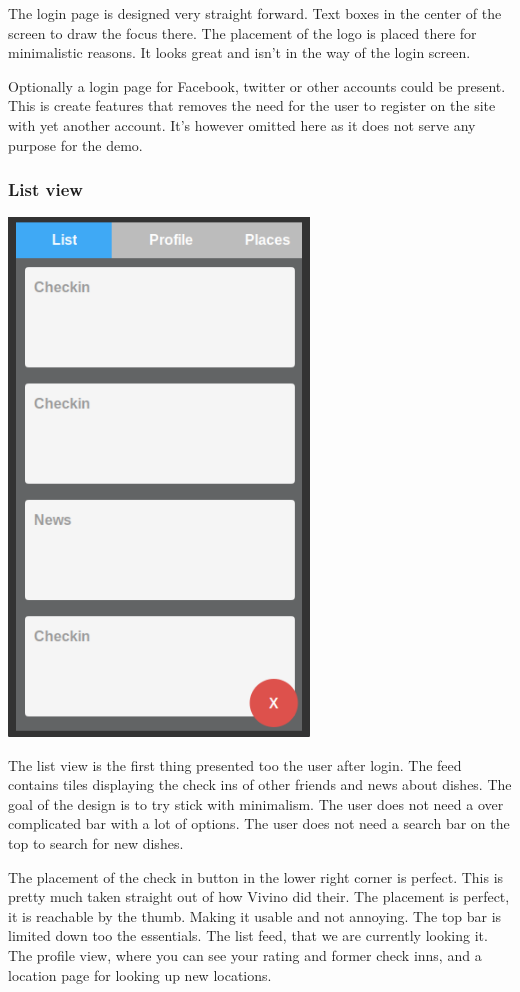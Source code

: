 \documentclass[12pt]{article}
\begin{document}
The login page is designed very straight forward. Text boxes in the center of
the screen to draw the focus there. The placement of the logo is placed there
for minimalistic reasons. It looks great and isn't in the way of the login
screen.

Optionally a login page for Facebook, twitter or other accounts could be
present. This is create features that removes the need for the user to register
on the site with yet another account. It's however omitted here as it does not
serve any purpose for the demo.


\subsubsection{List view}
\includegraphics[width=8cm]{pictures/prototype/list}
\bigbreak

The list view is the first thing presented too the user after login. The feed
contains tiles displaying the check ins of other friends and news about dishes.
The goal of the design is to try stick with minimalism. The user does not need a
over complicated bar with a lot of options. The user does not need a search bar
on the top to search for new dishes. 

The placement of the check in button in the lower right corner is perfect. This
is pretty much taken straight out of how Vivino did their. The placement is
perfect, it is reachable by the thumb. Making it usable and not annoying. The
top bar is limited down too the essentials. The list feed, that we are currently
looking it. The profile view, where you can see your rating and former check
inns, and a location page for looking up new locations.
\end{document}
